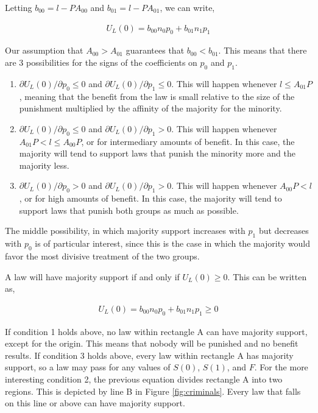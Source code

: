 Letting $b_{00} =  l  -  P A_{00} $ and $b_{01} = l - P A_{01} $, we can write,

\begin{align}
U_L(0) = b_{00}n_0p_0 + b_{01} n_1p_1 
\end{align}

Our assumption that $A_{00} > A_{01}$ guarantees that $b_{00} < b_{01}$.  This means that there are 3 possibilities for the signs of the coefficients on $p_0$ and $p_1$.

\begin{enumerate}
\item $\partial U_L(0) / \partial p_0 \leq 0$ and $\partial U_L(0) / \partial p_1 \leq 0$.  This will happen whenever $l \leq   A_{01}P $, meaning that the benefit from the law is small relative to the size of the punishment multiplied by the affinity of the majority for the minority.
\item $\partial U_L(0) / \partial p_0 \leq 0$ and $\partial U_L(0) / \partial p_1 > 0$.  This will happen whenever $  A_{01}P < l  \leq A_{00}P $, or for intermediary amounts of benefit.  In this case, the majority will tend to support laws that punish the minority more and the majority less.
\item $\partial U_L(0) / \partial p_0 > 0$ and $\partial U_L(0) / \partial p_1 > 0$.  This will happen whenever $   A_{00}P < l$, or for high amounts of benefit.  In this case, the majority will tend to support laws that punish both groups as much as possible.
\end{enumerate}

The middle possibility, in which majority support increases with $p_1$ but decreases with $p_0$ is of particular interest, since this is the case in which the majority would favor the most divisive treatment of the two groups.

A law will have majority support if and only if $U_L(0) \geq 0$.  This can be written as,

\begin{align}
U_L(0) = b_{00}n_0p_0 + b_{01} n_1p_1 \geq 0
\end{align}

If condition 1 holds above, no law within rectangle A can have majority support, except for the origin.  This means that nobody will be punished and no benefit results.  If condition 3 holds above, every law within rectangle A has majority support, so a law may pass for any values of $S(0)$, $S(1)$, and $F$.  For the more interesting condition 2, the previous equation divides rectangle A into two regions.  This is depicted by line B in Figure \ref{fig:criminals}.  Every law that falls on this line or above can have majority support.

